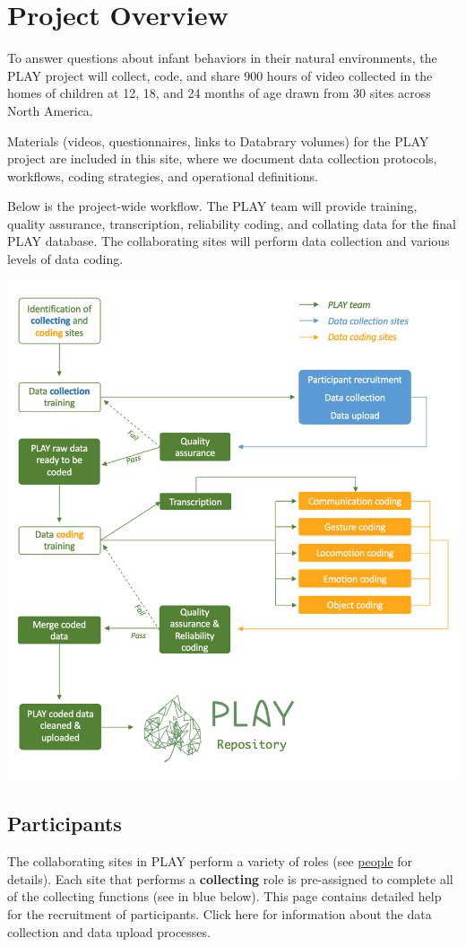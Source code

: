 \documentclass[
]{book}
\begin{document}
\hypertarget{overview}{%
\chapter{Project Overview}\label{overview}}

To answer questions about infant behaviors in their natural environments, the PLAY project will collect, code, and share 900 hours of video collected in the homes of children at 12, 18, and 24 months of age drawn from 30 sites across North America.

Materials (videos, questionnaires, links to Databrary volumes) for the PLAY project are included in this site, where we document data collection protocols, workflows, coding strategies, and operational definitions.

Below is the project-wide workflow. The PLAY team will provide training, quality assurance, transcription, reliability coding, and collating data for the final PLAY database. The collaborating sites will perform data collection and various levels of data coding.

\includegraphics[width=0.7\linewidth]{img/overview-project}

\hypertarget{participants}{%
\section{Participants}\label{participants}}

The collaborating sites in PLAY perform a variety of roles (see \protect\hyperlink{people}{people} for details). Each site that performs a \textbf{collecting} role is pre-assigned to complete all of the collecting functions (see in blue below). This page contains detailed help for the recruitment of participants. Click here for information about the data collection and data upload processes.
\end{document}
